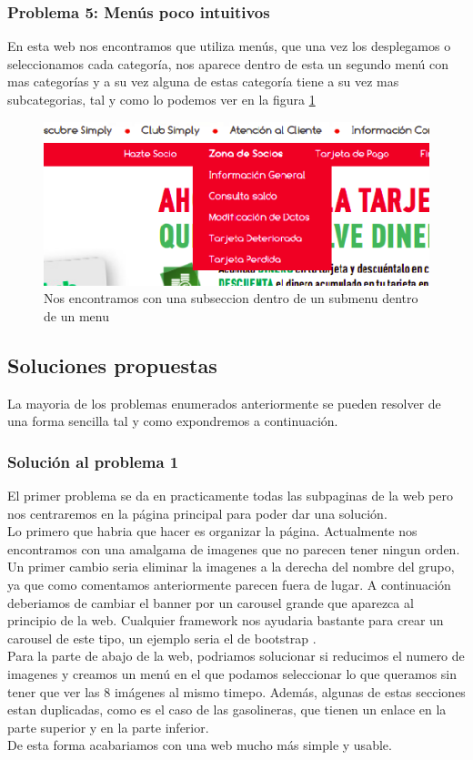 \documentclass[a4paper,11pt]{article}
\begin{document}
\subsubsection{Problema 5: Menús poco intuitivos}
En esta web nos encontramos que utiliza menús, que una vez los desplegamos o seleccionamos cada categoría, nos aparece dentro de esta un segundo menú con mas categorías y a su vez alguna de estas categoría tiene a su vez mas subcategorias, tal y como lo podemos ver en la figura \ref{fig:subsubmenu}

\begin{figure}[h!]
 \centering
 \includegraphics[scale=0.5]{subsubmenu.png}
 \caption{Nos encontramos con una subseccion dentro de un submenu dentro de un menu}
 \label{fig:subsubmenu}
\end{figure}



\subsection{Soluciones propuestas}
La mayoria de los problemas enumerados anteriormente se pueden resolver de una forma sencilla tal y como expondremos a continuación.

\subsubsection{Solución al problema 1}
El primer problema se da en practicamente todas las subpaginas de la web pero nos centraremos en la página principal para poder dar una solución.\\
Lo primero que habria que hacer es organizar la página. Actualmente nos encontramos con una amalgama de imagenes que no parecen tener ningun orden.
Un primer cambio seria eliminar la imagenes a la derecha del nombre del grupo, ya que como comentamos anteriormente parecen fuera de lugar.
A continuación deberiamos de cambiar el banner por un carousel grande que aparezca al principio de la web. Cualquier framework nos ayudaria bastante para crear un carousel de este tipo, un ejemplo seria el de bootstrap \cite{bootstrapcarr}.\\
Para la parte de abajo de la web, podriamos solucionar si reducimos el numero de imagenes y creamos un menú en el que podamos seleccionar lo que queramos sin tener que ver las 8 imágenes al mismo timepo. Además, algunas de estas secciones estan duplicadas, como es el caso de las gasolineras, que tienen un enlace en la parte superior y en la parte inferior.\\
De esta forma acabariamos con una web mucho más simple y usable.
\end{document}
